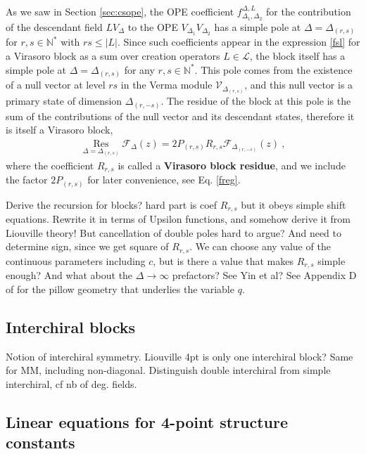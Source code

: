 \documentclass[12pt, a4paper]{article}
\theoremstyle{break}
\begin{document}
As we saw in Section \ref{sec:csope}, 
the OPE coefficient $f^{\Delta, L}_{\Delta_1,\Delta_2}$ for the contribution of the descendant field $LV_\Delta$ to the OPE $V_{\Delta_1}V_{\Delta_2}$ 
has a simple pole at $\Delta=\Delta_{(r,s)}$ for $r,s\in\mathbb{N}^*$ with $rs\leq |L|$. 
Since such coefficients appear in the expression \eqref{fsl} for a Virasoro block as a sum over creation operators $L\in\mathcal{L}$, 
the block itself has a simple pole at $\Delta=\Delta_{(r,s)}$ for any $r,s\in\mathbb{N}^*$. This pole comes from the existence of a null vector at level $rs$ in the Verma module $\mathcal{V}_{\Delta_{(r,s)}}$, and this null vector is a primary state of dimension $\Delta_{(r,-s)}$. The residue of the block at this pole is the sum of the contributions of the null vector and its descendant states, therefore it is itself a Virasoro block,
\begin{align}
 \underset{\Delta=\Delta_{(r,s)}}{\operatorname{Res}} \mathcal{F}_\Delta(z) = 2P_{(r,s)}R_{r,s}\mathcal{F}_{\Delta_{(r,-s)}}(z)\ ,
 \label{resf}
\end{align}
where the coefficient $R_{r,s}$ is called a \textbf{Virasoro block residue}, and we include the factor $2P_{(r,s)}$ for later convenience, see Eq. \eqref{freg}. 


Derive the recursion for blocks? hard part is coef $R_{r,s}$ but it obeys simple shift equations. Rewrite it in terms of Upsilon functions, and somehow derive it from Liouville theory! But cancellation of double poles hard to argue? And need to determine sign, since we get square of $R_{r,s}$. We can choose any value of the continuous parameters including $c$, but is there a value that makes $R_{r,s}$ simple enough? And what about the $\Delta\to\infty$ prefactors? See Yin et al? See Appendix D of \cite{msz15} for the pillow geometry that underlies the variable $q$.



\subsection{Interchiral blocks} \label{sec:icb}

Notion of interchiral symmetry. Liouville 4pt is only one interchiral block? Same for MM, including non-diagonal. Distinguish double interchiral from simple interchiral, cf nb of deg. fields. 

\subsection{Linear equations for 4-point structure constants}
\end{document}
